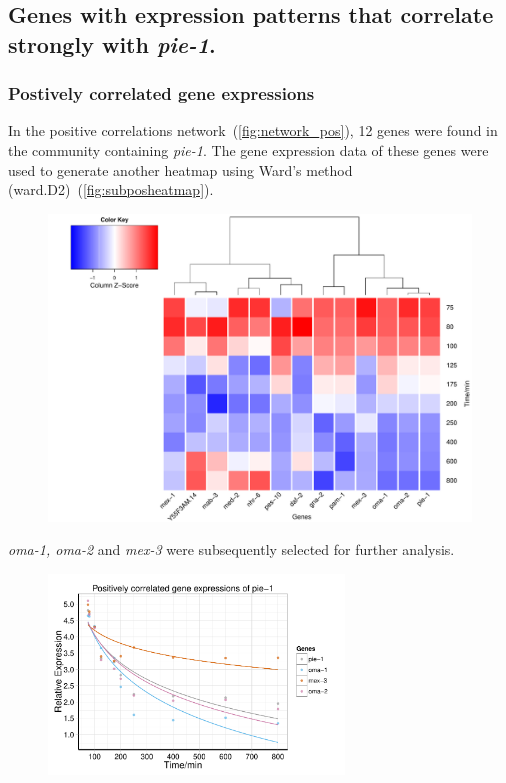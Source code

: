 \documentclass[11pt]{article}
\begin{document}
\subsection{Genes with expression patterns that correlate strongly with \textit{pie-1}.}

\subsubsection{Postively correlated gene expressions}
In the positive correlations network~(\autoref{fig:network_pos}), 12 genes were found in the community containing \textit{pie-1}. The gene expression data of these genes were used to generate another heatmap using Ward's method (ward.D2)~(\autoref{fig:subposheatmap}). 

\begin{figure}[H]
  \centering
    \includegraphics[width=\textwidth]{subposheatmap.pdf}
  \label{fig:subposheatmap}
\end{figure}

\textit{oma-1, oma-2} and \textit{mex-3} were subsequently selected for further analysis.

\begin{figure}[H]
  \centering
    \includegraphics[width=0.7\textwidth]{subposplot.pdf}
  \label{fig:subposplot}
\end{figure}
\end{document}
